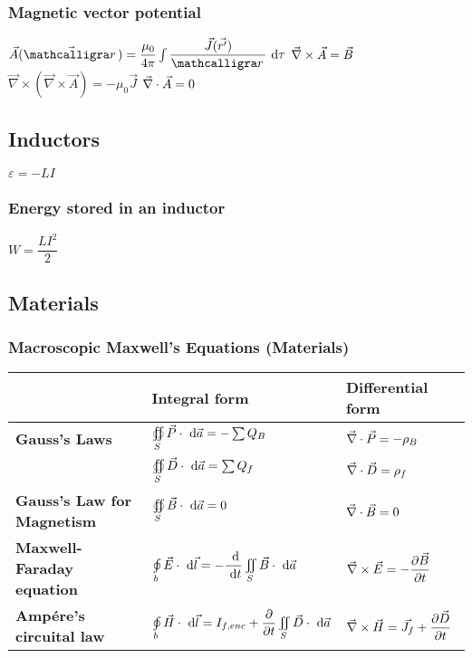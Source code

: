 \subsubsection{Magnetic vector potential}
\begin{itemize}
\itemt \( \vec{A}(\vec{\scriptr}) = \dfrac{\mu_0}{4\pi} \int \dfrac{\vec{J}(\vec{r'})}{\scriptr} \dn \tau \)
\itemt \( \vec{\nabla}\times\vec{A} = \vec{B} \)
\itemt \( \vec{\nabla} \times (\vec{\nabla} \times \vec{A}) = -\mu_0 \vec{J} \)
\itemt \( \vec{\nabla}\cdot\vec{A} = 0 \)
\end{itemize}

		\subsection{Inductors}
        
\begin{itemize}
\itemt \( \varepsilon = - LI \)
\end{itemize}
        
\subsubsection{Energy stored in an inductor}  
\begin{itemize}
\itemt \( W = \dfrac{LI^2}{2} \)
\end{itemize}

		\subsection{Materials}

\subsubsection{Macroscopic Maxwell's Equations (Materials)}

\def\arraystretch{2.5}
\begin{tabular}{ |l|l|l| } 
\hline
					
  &	\textbf{Integral form}	& 	\textbf{Differential form}
\\ \hline

\textbf{Gauss's Laws}	
&\( \oiint\limits_{S} \vec{P} \cdot \ \mathrm{d}\vec{a} = -\sum Q_B \)	
& \( \vec{\nabla}\cdot \vec{P} = -\rho_B \)
\\
& \( \oiint\limits_{S} \vec{D}\cdot\ \mathrm{d}\vec{a} = \sum Q_f \) 
& \( \vec{\nabla}\cdot \vec{D} = \rho_f \)
\\ \hline

\textbf{Gauss's Law for Magnetism}	
&\( \oiint\limits_{S} \vec{B} \cdot \ \mathrm{d}\vec{a} = 0 \)
&\( \vec{\nabla}\cdot \vec{B} = 0 \)
\\ \hline

\textbf{Maxwell-Faraday equation}	
&\( \oint\limits_{b} \vec{E} \cdot \dn\vec{l} = -\dd{}{t} \iint\limits_S \vec{B} \cdot \dn\vec{a}\)	
&\( \vec{\nabla}\times \vec{E} = -\dfrac{\partial \vec{B}}{\partial t} \)
\\ \hline

\textbf{Amp\'ere's circuital law}	
& \( \oint\limits_{b} \vec{H} \cdot \ \mathrm{d}\vec{l} = I_{f,enc} + \dfrac{\partial }{\partial t} \iint\limits_S \vec{D}\cdot \ \mathrm{d}\vec{a}\)	
&\( \vec{\nabla}\times \vec{H} = \vec{J_f} + \dfrac{\partial \vec{D}}{\partial t} \)
\\ \hline
\end{tabular}


